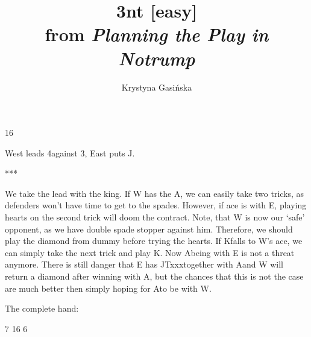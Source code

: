 \documentclass[12pt, a4paper]{article}
\title{3nt [easy]\\\vspace{0.3cm}\normalsize{from \textit{Planning the Play in Notrump}}}
\author{Krystyna Gasińska}
\begin{document}
\maketitle

        {}{}
        {}{16}
        {}{}
        {}

West leads 4\spades against 3\nt, East puts J\spades.
\begin{center}
    ***
\end{center}
We take the lead with the king. 
If W has the A\hearts, we can easily take two \hearts
tricks, as defenders won't have time to get to the spades.
However, if ace is with E, playing hearts on the second trick
will doom the contract. Note, that W is now our `safe' opponent,
as we have double spade stopper against him.
Therefore, we should play the diamond from dummy before 
trying the hearts. If K\diams falls to W's ace, we
can simply take the next trick and play K\hearts.
Now A\hearts being with E is not a threat anymore.
There is still danger that E has JTxxx\diams together with A\hearts and W will
return a diamond after winning with A\diams, 
but the chances that this is not the case are much better
then simply hoping for A\hearts to be with W.

\vspace{0.2cm}

The complete hand:

        {}{7}
        {}{16}
        {}{6}
        {}
\end{document}

